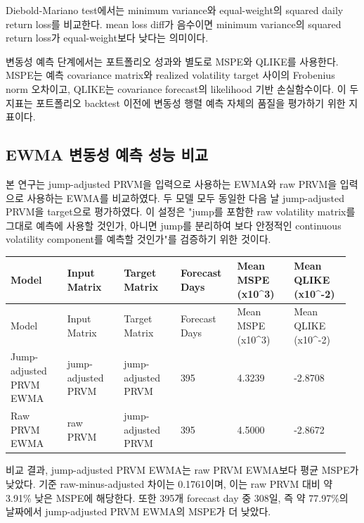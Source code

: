 \documentclass[12pt,a4paper]{article}
\begin{document}
Diebold-Mariano test에서는 minimum variance와 equal-weight의 squared daily return loss를 비교한다. mean loss diff가 음수이면 minimum variance의 squared return loss가 equal-weight보다 낮다는 의미이다.

변동성 예측 단계에서는 포트폴리오 성과와 별도로 MSPE와 QLIKE를 사용한다. MSPE는 예측 covariance matrix와 realized volatility target 사이의 Frobenius norm 오차이고, QLIKE는 covariance forecast의 likelihood 기반 손실함수이다. 이 두 지표는 포트폴리오 backtest 이전에 변동성 행렬 예측 자체의 품질을 평가하기 위한 지표이다.

\subsection{EWMA 변동성 예측 성능 비교}

본 연구는 jump-adjusted PRVM을 입력으로 사용하는 EWMA와 raw PRVM을 입력으로 사용하는 EWMA를 비교하였다. 두 모델 모두 동일한 다음 날 jump-adjusted PRVM을 target으로 평가하였다. 이 설정은 "jump를 포함한 raw volatility matrix를 그대로 예측에 사용할 것인가, 아니면 jump를 분리하여 보다 안정적인 continuous volatility component를 예측할 것인가"를 검증하기 위한 것이다.

\begin{center}
\scriptsize
\begin{longtable}{@{}p{0.16\linewidth}p{0.16\linewidth}p{0.16\linewidth}p{0.16\linewidth}p{0.16\linewidth}p{0.16\linewidth}@{}}
\toprule
Model & Input Matrix & Target Matrix & Forecast Days & Mean MSPE (x10\textasciicircum{}3) & Mean QLIKE (x10\textasciicircum{}-2) \\
\midrule
\endfirsthead
\toprule
Model & Input Matrix & Target Matrix & Forecast Days & Mean MSPE (x10\textasciicircum{}3) & Mean QLIKE (x10\textasciicircum{}-2) \\
\midrule
\endhead
Jump-adjusted PRVM EWMA & jump-adjusted PRVM & jump-adjusted PRVM & 395 & 4.3239 & -2.8708 \\
Raw PRVM EWMA & raw PRVM & jump-adjusted PRVM & 395 & 4.5000 & -2.8672 \\
\bottomrule
\end{longtable}
\end{center}


비교 결과, jump-adjusted PRVM EWMA는 raw PRVM EWMA보다 평균 MSPE가 낮았다. \texttt{} 기준 raw-minus-adjusted 차이는 0.1761이며, 이는 raw PRVM 대비 약 3.91\% 낮은 MSPE에 해당한다. 또한 395개 forecast day 중 308일, 즉 약 77.97\%의 날짜에서 jump-adjusted PRVM EWMA의 MSPE가 더 낮았다.
\end{document}
